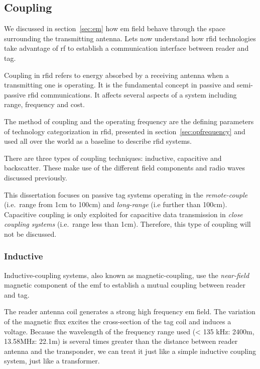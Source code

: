 \subsection{Coupling}


We discussed in section~\ref{sec:em} how \acl{em} field behave through the space surrounding the transmitting antenna. Lets now understand how \ac{rfid} technologies take advantage of \acl{rf} to establish a communication interface between reader and tag.

Coupling in \ac{rfid} refers to energy absorbed by a receiving antenna when a transmitting one is operating. 
It is the fundamental concept in passive and semi-passive \ac{rfid} communications.
It affects several aspects of a system including range, frequency and cost.

The method of coupling and the operating frequency are the defining parameters of technology categorization in \ac{rfid}, presented in section~\ref{sec:opfrequency} and used all over the world as a baseline to describe \ac{rfid} systems.

There are three types of coupling techniques: inductive, capacitive and backscatter. These make use of the different field components and radio waves discussed previously.

This dissertation focuses on passive tag systems operating in the \emph{remote-couple} (i.e.\ range from 1cm to 100cm) and \emph{long-range} (i.e further than 100cm).
Capacitive coupling is only exploited for capacitive data transmission in \emph{close coupling systems} (i.e.\ range less than 1cm). Therefore, this type of coupling will not be discussed.

\subsubsection{Inductive}

Inductive-coupling systems, also known as magnetic-coupling, use the \emph{near-field} magnetic component of the \ac{emf} to establish a mutual coupling between reader and tag.

The reader antenna coil generates a strong high frequency \ac{em} field. The variation of the magnetic flux excites the cross-section of the tag coil and induces a voltage.
Because the wavelength of the frequency range used (< 135 kHz: 2400m, 13.58MHz: 22.1m) is several times greater than the distance between reader antenna and the transponder, we can treat it just like a simple inductive coupling system, just like a transformer.

